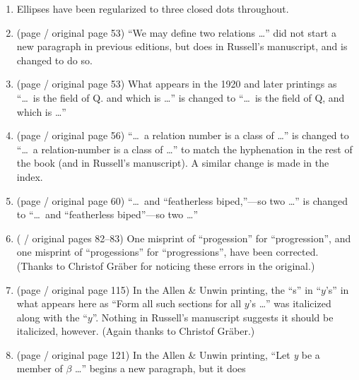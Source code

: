 \begin{enumerate}[noitemsep,label=\alph*)]
\item Ellipses have been regularized to three closed dots throughout.
\item (page \pageref{minor:page53} / original page 53) ``We may define two relations \ldots'' did not
start a new paragraph in previous editions, but does in Russell's 
manuscript, and is changed to do so.
 \item (page \pageref{change:minor53} / original page 53) What appears in the 1920 and later printings as ``\ldots\ is the field of Q. and which is \ldots'' is
 changed to ``\ldots\ is the field of Q, and which is \ldots''
\item (page \pageref{minor:page56} / original page 56) ``\ldots\ a relation number is a class of \ldots'' is changed
to ``\ldots\ a relation-number is a class of \ldots'' to match the hyphenation in the rest of the book (and
in Russell's manuscript). A similar change is made in the index.
\item (page \pageref{change:minor60} / original page 60) ``\ldots\ and ``featherless bi\-ped,''---so two \ldots'' 
is changed to ``\ldots\ \iphoneonly{\linebreak}and ``featherless bi\-ped''\iphoneonly{\linebreak}---so two \ldots''
\item ( / original pages 82--83) One misprint of ``progession'' for ``progression'', and one misprint of ``progessions'' for ``progressions'', have been corrected. (Thanks to Christof Gr{\"a}ber for noticing these errors in the original.)
\item (page \pageref{minor:115} / original page 115) In the Allen \& Unwin printing, the ``s'' in ``$y$'s'' in what appears here as ``Form all such sections for all $y$'s \ldots'' was italicized along with the ``$y$''. Nothing in Russell's manuscript suggests it should be italicized, however. (Again thanks to Christof Gr{\"a}ber.)
\item (page \pageref{change:minor121} / original page 121) In the Allen \& Unwin printing,
``Let \textit{y}
be a member of $\beta$ \ldots'' begins a new paragraph, but it does 

\end{enumerate}
